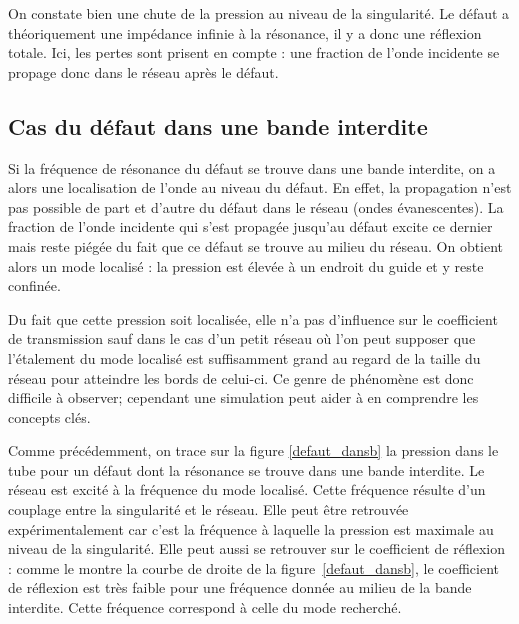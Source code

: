 \bigskip
On constate bien une chute de la pression au niveau de la singularité. Le défaut a théoriquement une impédance infinie à la résonance, il y a donc une réflexion totale. Ici, les pertes sont prisent en compte : une fraction de l'onde incidente se propage donc dans le réseau après le défaut.



\subsection{Cas du défaut dans une bande interdite}

Si la fréquence de résonance du défaut se trouve dans une bande interdite, on a alors une localisation de l'onde au niveau du défaut. En effet, la propagation n'est pas possible de part et d'autre du défaut dans le réseau (ondes évanescentes). La fraction de l'onde incidente qui s'est propagée jusqu'au défaut excite ce dernier mais reste piégée du fait que ce défaut se trouve au milieu du réseau. On obtient alors un mode localisé : la pression est élevée à un endroit du guide et y reste confinée.
\bigskip


Du fait que cette pression soit localisée, elle n'a pas d'influence sur le coefficient de transmission sauf dans le cas d'un petit réseau où l'on peut supposer que l'étalement du mode localisé est suffisamment grand au regard de la taille du réseau pour atteindre les bords de celui-ci. Ce genre de phénomène est donc difficile à observer; cependant une simulation peut aider à en comprendre les concepts clés.
\bigskip

Comme précédemment, on trace sur la figure \ref{defaut_dansb} la pression dans le tube pour un défaut dont la résonance se trouve dans une bande interdite. Le réseau est excité à la fréquence du mode localisé. Cette fréquence résulte d'un couplage entre la singularité et le réseau. Elle peut être retrouvée expérimentalement car c'est la fréquence à laquelle la pression est maximale au niveau de la singularité. Elle peut aussi se retrouver sur le coefficient de réflexion : comme le montre la courbe de droite de la figure~\ref{defaut_dansb}, le coefficient de réflexion est très faible pour une fréquence donnée au milieu de la bande interdite. Cette fréquence correspond à celle du mode recherché.


